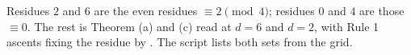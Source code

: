Residues $2$ and $6$ are the even residues $\equiv 2 \pmod 4$; residues $0$ and $4$ are those $\equiv 0$. The rest is Theorem (a) and (c) read at $d = 6$ and $d = 2$, with Rule 1 ascents fixing the residue by . The script lists both sets from the grid.
